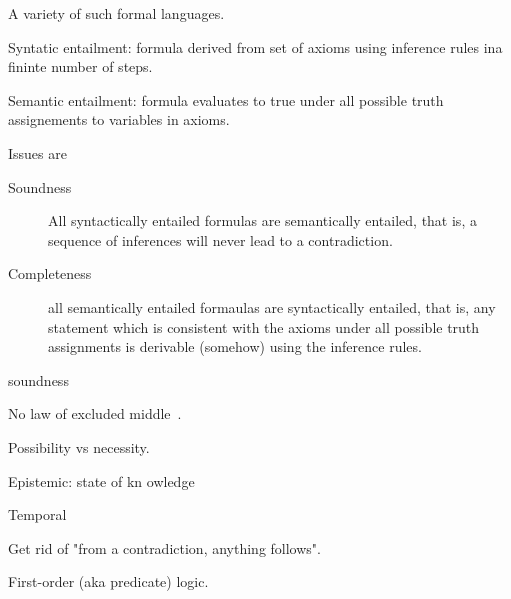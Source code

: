 A variety of such formal languages.

Syntatic entailment: formula derived from set of axioms 
using inference rules ina fininte number of steps.

Semantic entailment: formula evaluates to \textsf{true}
under all possible truth assignements to variables
in axioms.

Issues are 
\begin{description}
\item[Soundness]
All syntactically entailed formulas
are semantically entailed, that is,
a sequence of inferences will never lead to a contradiction.

\item[Completeness] 
all semantically entailed formaulas 
are syntactically entailed, that is,
any statement which is consistent with the axioms under all 
possible truth assignments is derivable (somehow) using the 
inference rules.
\end{description}soundness 

\label{sec:Intuitionist_zeroth_order_logic}

\cite{wiki:Intuitionistic_logic}

No law of excluded middle~\cite{wiki:Law_of_excluded_middle}.

\label{sec:Modal_logic}

\cite{wiki:Modal_logic}

Possibility vs necessity.

Epistemic: state of kn owledge

Temporal 

\label{sec:Paraconsistent_logic}

\cite{wiki:Paraconsistent_logic}

Get rid of "from a contradiction, anything follows".
\label{sec:First_order_logic}

First-order (aka predicate) logic.~\cite{wiki:First_order_logic,
sep:logic_firstorder_emergence}

